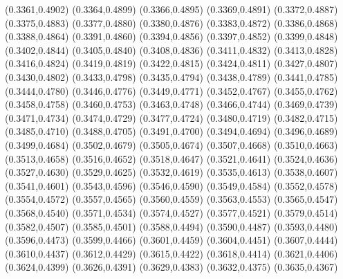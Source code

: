 \PST@Cross(0.3361,0.4902)
\PST@Cross(0.3364,0.4899)
\PST@Cross(0.3366,0.4895)
\PST@Cross(0.3369,0.4891)
\PST@Cross(0.3372,0.4887)
\PST@Cross(0.3375,0.4883)
\PST@Cross(0.3377,0.4880)
\PST@Cross(0.3380,0.4876)
\PST@Cross(0.3383,0.4872)
\PST@Cross(0.3386,0.4868)
\PST@Cross(0.3388,0.4864)
\PST@Cross(0.3391,0.4860)
\PST@Cross(0.3394,0.4856)
\PST@Cross(0.3397,0.4852)
\PST@Cross(0.3399,0.4848)
\PST@Cross(0.3402,0.4844)
\PST@Cross(0.3405,0.4840)
\PST@Cross(0.3408,0.4836)
\PST@Cross(0.3411,0.4832)
\PST@Cross(0.3413,0.4828)
\PST@Cross(0.3416,0.4824)
\PST@Cross(0.3419,0.4819)
\PST@Cross(0.3422,0.4815)
\PST@Cross(0.3424,0.4811)
\PST@Cross(0.3427,0.4807)
\PST@Cross(0.3430,0.4802)
\PST@Cross(0.3433,0.4798)
\PST@Cross(0.3435,0.4794)
\PST@Cross(0.3438,0.4789)
\PST@Cross(0.3441,0.4785)
\PST@Cross(0.3444,0.4780)
\PST@Cross(0.3446,0.4776)
\PST@Cross(0.3449,0.4771)
\PST@Cross(0.3452,0.4767)
\PST@Cross(0.3455,0.4762)
\PST@Cross(0.3458,0.4758)
\PST@Cross(0.3460,0.4753)
\PST@Cross(0.3463,0.4748)
\PST@Cross(0.3466,0.4744)
\PST@Cross(0.3469,0.4739)
\PST@Cross(0.3471,0.4734)
\PST@Cross(0.3474,0.4729)
\PST@Cross(0.3477,0.4724)
\PST@Cross(0.3480,0.4719)
\PST@Cross(0.3482,0.4715)
\PST@Cross(0.3485,0.4710)
\PST@Cross(0.3488,0.4705)
\PST@Cross(0.3491,0.4700)
\PST@Cross(0.3494,0.4694)
\PST@Cross(0.3496,0.4689)
\PST@Cross(0.3499,0.4684)
\PST@Cross(0.3502,0.4679)
\PST@Cross(0.3505,0.4674)
\PST@Cross(0.3507,0.4668)
\PST@Cross(0.3510,0.4663)
\PST@Cross(0.3513,0.4658)
\PST@Cross(0.3516,0.4652)
\PST@Cross(0.3518,0.4647)
\PST@Cross(0.3521,0.4641)
\PST@Cross(0.3524,0.4636)
\PST@Cross(0.3527,0.4630)
\PST@Cross(0.3529,0.4625)
\PST@Cross(0.3532,0.4619)
\PST@Cross(0.3535,0.4613)
\PST@Cross(0.3538,0.4607)
\PST@Cross(0.3541,0.4601)
\PST@Cross(0.3543,0.4596)
\PST@Cross(0.3546,0.4590)
\PST@Cross(0.3549,0.4584)
\PST@Cross(0.3552,0.4578)
\PST@Cross(0.3554,0.4572)
\PST@Cross(0.3557,0.4565)
\PST@Cross(0.3560,0.4559)
\PST@Cross(0.3563,0.4553)
\PST@Cross(0.3565,0.4547)
\PST@Cross(0.3568,0.4540)
\PST@Cross(0.3571,0.4534)
\PST@Cross(0.3574,0.4527)
\PST@Cross(0.3577,0.4521)
\PST@Cross(0.3579,0.4514)
\PST@Cross(0.3582,0.4507)
\PST@Cross(0.3585,0.4501)
\PST@Cross(0.3588,0.4494)
\PST@Cross(0.3590,0.4487)
\PST@Cross(0.3593,0.4480)
\PST@Cross(0.3596,0.4473)
\PST@Cross(0.3599,0.4466)
\PST@Cross(0.3601,0.4459)
\PST@Cross(0.3604,0.4451)
\PST@Cross(0.3607,0.4444)
\PST@Cross(0.3610,0.4437)
\PST@Cross(0.3612,0.4429)
\PST@Cross(0.3615,0.4422)
\PST@Cross(0.3618,0.4414)
\PST@Cross(0.3621,0.4406)
\PST@Cross(0.3624,0.4399)
\PST@Cross(0.3626,0.4391)
\PST@Cross(0.3629,0.4383)
\PST@Cross(0.3632,0.4375)
\PST@Cross(0.3635,0.4367)
